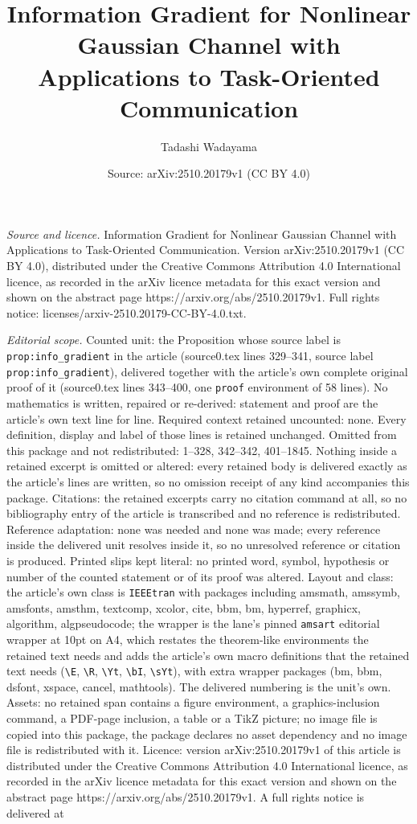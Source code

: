 \documentclass[10pt,a4paper]{amsart}
\title[Information Gradient for Nonlinear Gaussian Channel with App]{Information Gradient for Nonlinear Gaussian Channel with Applications to Task-Oriented Communication}
\author{Tadashi Wadayama}
\date{Source: arXiv:2510.20179v1 (CC BY 4.0)}
\begin{document}
\maketitle

\noindent\emph{Source and licence.} Information Gradient for Nonlinear Gaussian Channel with Applications to Task-Oriented Communication. Version arXiv:2510.20179v1 (CC BY 4.0), distributed under the Creative Commons Attribution 4.0 International licence, as recorded in the arXiv licence metadata for this exact version and shown on the abstract page https://arxiv.org/abs/2510.20179v1. Full rights notice: licenses/arxiv-2510.20179-CC-BY-4.0.txt.\par\smallskip

\noindent\textit{Editorial scope.} Counted unit: the Proposition whose source label is \texttt{prop:info\_gradient} in the article (source0.tex lines 329--341, source label \texttt{prop:info\_gradient}), delivered together with the article's own complete original proof of it (source0.tex lines 343--400, one \texttt{proof} environment of 58 lines). No mathematics is written, repaired or re-derived: statement and proof are the article's own text line for line. Required context retained uncounted: none. Every definition, display and label of those lines is retained unchanged. Omitted from this package and not redistributed: 1--328, 342--342, 401--1845. Nothing inside a retained excerpt is omitted or altered: every retained body is delivered exactly as the article's lines are written, so no omission receipt of any kind accompanies this package. Citations: the retained excerpts carry no citation command at all, so no bibliography entry of the article is transcribed and no reference is redistributed. Reference adaptation: none was needed and none was made; every reference inside the delivered unit resolves inside it, so no unresolved reference or citation is produced. Printed slips kept literal: no printed word, symbol, hypothesis or number of the counted statement or of its proof was altered. Layout and class: the article's own class is \texttt{IEEEtran} with packages including amsmath, amssymb, amsfonts, amsthm, textcomp, xcolor, cite, bbm, bm, hyperref, graphicx, algorithm, algpseudocode; the wrapper is the lane's pinned \texttt{amsart} editorial wrapper at 10pt on A4, which restates the theorem-like environments the retained text needs and adds the article's own macro definitions that the retained text needs (\texttt{\textbackslash E}, \texttt{\textbackslash R}, \texttt{\textbackslash Yt}, \texttt{\textbackslash bI}, \texttt{\textbackslash sYt}), with extra wrapper packages (bm, bbm, dsfont, xspace, cancel, mathtools). The delivered numbering is the unit's own. Assets: no retained span contains a figure environment, a graphics-inclusion command, a PDF-page inclusion, a table or a TikZ picture; no image file is copied into this package, the package declares no asset dependency and no image file is redistributed with it. Licence: version arXiv:2510.20179v1 of this article is distributed under the Creative Commons Attribution 4.0 International licence, as recorded in the arXiv licence metadata for this exact version and shown on the abstract page https://arxiv.org/abs/2510.20179v1. A full rights notice is delivered at 
\end{document}
